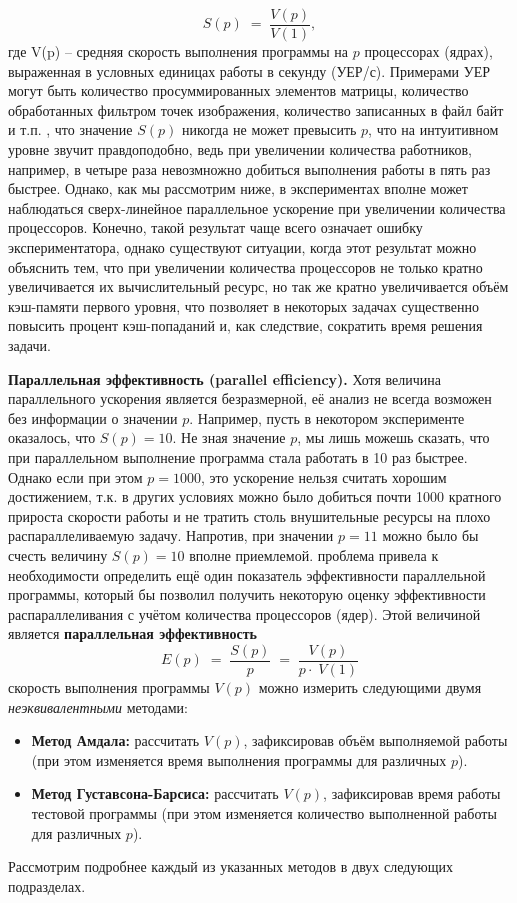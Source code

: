 {	\begin{equation}
		\label{parallelAcceleration:equation}
		S(p)\;=\;\frac{V(p)}{V(1)},
	\end{equation}
	где V(p) – средняя скорость выполнения программы на $p$ процессорах (ядрах), выраженная в условных единицах работы в секунду (УЕР/с). Примерами УЕР могут быть количество просуммированных элементов матрицы, количество обработанных фильтром точек изображения, количество записанных в файл байт и т.п.
	, что значение $S(p)$ никогда не может превысить $p$, что на интуитивном уровне звучит правдоподобно, ведь при увеличении количества работников, например, в четыре раза невозмножно добиться выполнения работы в пять раз быстрее.  Однако, как мы рассмотрим ниже, в экспериментах вполне может наблюдаться сверх-линейное параллельное ускорение при увеличении количества процессоров. Конечно, такой результат чаще всего означает ошибку экспериментатора, однако существуют ситуации, когда этот результат можно объяснить тем, что при увеличении количества процессоров не только кратно увеличивается их вычислительный ресурс, но так же кратно увеличивается объём кэш-памяти первого уровня, что позволяет в некоторых задачах существенно повысить процент кэш-попаданий и, как следствие, сократить время решения задачи.
	\par\textbf{Параллельная эффективность (parallel efficiency).} Хотя величина параллельного ускорения является безразмерной, её анализ не всегда возможен без информации о значении $p$. Например, пусть в некотором эксперименте оказалось, что $S(p)=10$. Не зная значение $p$, мы лишь можешь сказать, что при параллельном выполнение программа стала работать в 10 раз быстрее. Однако если при этом $p=1000$, это ускорение нельзя считать хорошим достижением, т.к. в других условиях можно было добиться почти 1000 кратного прироста скорости работы и не тратить столь внушительные ресурсы на плохо распараллеливаемую задачу. Напротив, при значении $p=11$ можно было бы счесть  величину $S(p)=10$ вполне приемлемой.
	 проблема привела к необходимости определить ещё один показатель эффективности параллельной программы, который бы позволил получить некоторую оценку эффективности распараллеливания с учётом  количества процессоров (ядер). Этой величиной является \textbf{параллельная эффективность}
	\begin{equation}
		\label{parallelEffect:equation}
		E(p)\;=\;\frac{S(p)}p\;=\;\frac{V(p)}{p\cdot\;V(1)}
	\end{equation}
	 скорость выполнения программы $V(p)$ можно измерить следующими двумя \textit{неэквивалентными} методами:
	\begin{itemize}
		\item\textbf{Метод Амдала:} рассчитать $V(p)$, зафиксировав объём выполняемой работы (при этом изменяется время выполнения программы для различных $p$).
		\item\textbf{Метод Густавсона-Барсиса:} рассчитать $V(p)$, зафиксировав время работы тестовой программы (при этом изменяется количество выполненной работы для различных $p$).
	\end{itemize}
	Рассмотрим подробнее каждый из указанных методов в двух следующих подразделах.
	\par
}